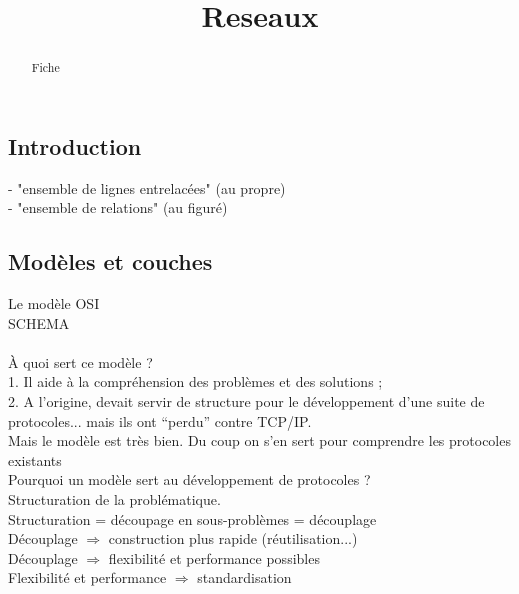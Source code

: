 \documentclass[5pt]{article}
\begin{document}
\begin{scriptsize}
\title{Reseaux}
\date{}
\begin{abstract}
Fiche
\end{abstract}
\subsection*{Introduction}
- "ensemble de lignes entrelacées" (au propre)\\
- "ensemble de relations" (au figuré)\\
\subsection*{Modèles et couches}
Le modèle OSI\\
SCHEMA\\
\\
À quoi sert ce modèle ?\\
1. Il aide à la compréhension des problèmes et des solutions ;\\
2. A l’origine, devait servir de structure pour le développement d’une suite de protocoles... mais ils ont “perdu” contre TCP/IP.\\
Mais le modèle est très bien. Du coup on s’en sert pour comprendre les protocoles existants\\
Pourquoi un modèle sert au développement de protocoles ?\\ Structuration de la problématique.\\
Structuration = découpage en sous-problèmes = découplage\\ 
Découplage $\Rightarrow$ construction plus rapide (réutilisation...)\\
Découplage $\Rightarrow$ flexibilité et performance possibles\\
Flexibilité et performance $\Rightarrow$ standardisation\\

\end{scriptsize}
\end{document}
